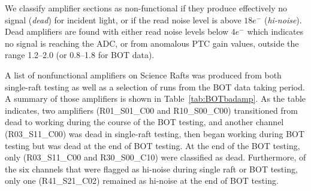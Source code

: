 We classify amplifier sections as non-functional if they produce effectively no signal ({\it dead}) for incident light, or if the read noise level is above $18e^{-}$ ({\it hi-noise}).  Dead amplifiers are found with either read noise levels below $4e^{-}$ which indicates no signal is reaching the ADC, or from anomalous PTC gain values, outside the range 1.2--2.0 (or 0.8--1.8 for BOT data). 

A list of nonfunctional amplifiers on Science Rafts was produced from both single-raft testing as well as a selection of runs from the BOT data taking period. A summary of those amplifiers is shown in Table~\ref{tab:BOTbadamp}. As the table indicates, two amplifiers (R01\_S01\_C00 and R10\_S00\_C00) transitioned from dead to working during the course of the BOT testing, and another channel (R03\_S11\_C00) was dead in single-raft testing, then began working during BOT testing but was dead at the end of BOT testing. At the end of the BOT testing, only (R03\_S11\_C00 and R30\_S00\_C10) were classified as dead. Furthermore, of the six channels that were flagged as hi-noise during single raft or BOT testing, only one (R41\_S21\_C02) remained as hi-noise at the end of BOT testing.

